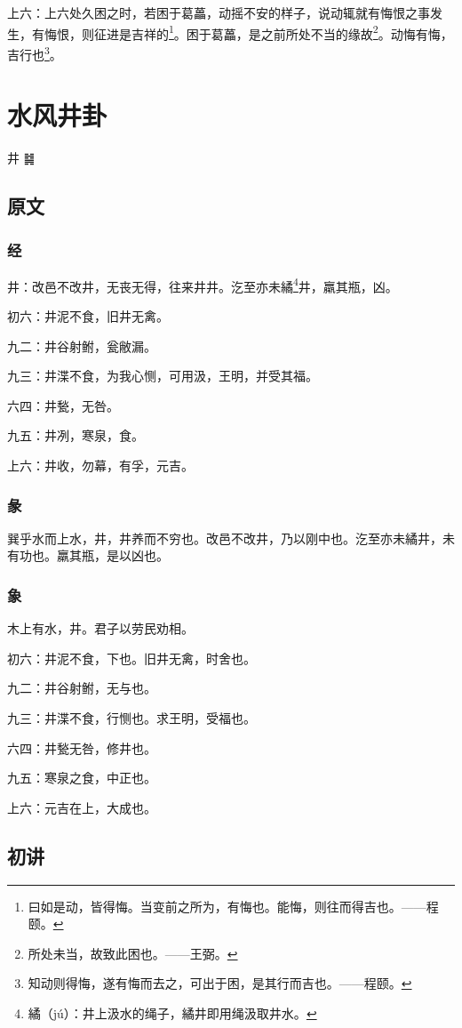 \documentclass[12pt,oneside]{book}
\begin{document}
上六：上六处久困之时，若困于葛藟，动摇不安的样子，说动辄就有悔恨之事发生，有悔恨，则征进是吉祥的\footnote{曰如是动，皆得悔。当变前之所为，有悔也。能悔，则往而得吉也。——程颐。}。困于葛藟，是之前所处不当的缘故\footnote{所处未当，故致此困也。——王弼。}。动悔有悔，吉行也\footnote{知动则得悔，遂有悔而去之，可出于困，是其行而吉也。——程颐。}。


\chapter{水风井卦}
井 {\Large ䷯}

\section{原文}

\subsection{经}
井：改邑不改井，无丧无得，往来井井。汔至亦未繘\footnote{繘（jú）：井上汲水的绳子，繘井即用绳汲取井水。}井，羸其瓶，凶。

初六：井泥不食，旧井无禽。

九二：井谷射鲋，瓮敝漏。

九三：井渫不食，为我心恻，可用汲，王明，并受其福。

六四：井甃，无咎。

九五：井冽，寒泉，食。

上六：井收，勿幕，有孚，元吉。

\subsection{彖}
巽乎水而上水，井，井养而不穷也。改邑不改井，乃以刚中也。汔至亦未繘井，未有功也。羸其瓶，是以凶也。

\subsection{象}
木上有水，井。君子以劳民劝相。

初六：井泥不食，下也。旧井无禽，时舍也。

九二：井谷射鲋，无与也。

九三：井渫不食，行恻也。求王明，受福也。

六四：井甃无咎，修井也。

九五：寒泉之食，中正也。

上六：元吉在上，大成也。

\section{初讲}
\end{document}
